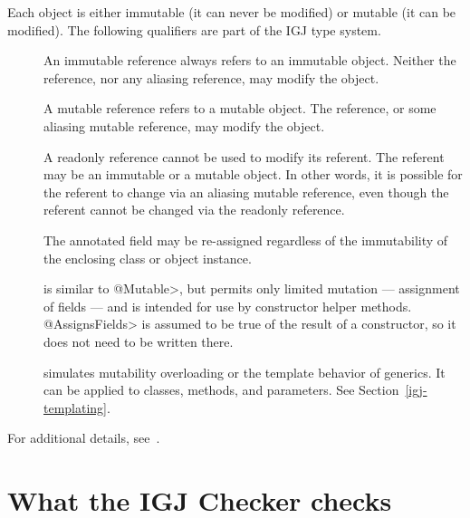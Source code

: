 Each object is either immutable (it can never be modified) or mutable (it
can be modified).  The following qualifiers are part of the IGJ type system.

\begin{description}

\item[]
  An immutable reference always refers to an immutable object.  Neither the
  reference, nor any aliasing reference, may modify the object.

\item[]
  A mutable reference refers to a mutable object.  The reference, or some
  aliasing mutable reference, may modify the object.

\item[]
  A readonly reference cannot be used to modify its referent.  The referent
  may be an immutable or a mutable object.  In other words, it is possible
  for the referent to change via an aliasing mutable reference, even though
  the referent cannot be changed via the readonly reference.

\item[]
  The annotated field may be re-assigned regardless of the
  immutability of the enclosing class or object instance.

\item[]
  is similar to \<@Mutable>, but permits only limited mutation ---
  assignment of fields --- and is intended for use by constructor helper
  methods.  \<@AssignsFields> is assumed to be true of the result of a
  constructor, so it does not need to be written there.

\item[]
  simulates mutability overloading or the template behavior of generics.
  It can be applied to classes, methods, and parameters.  See
  Section~\ref{igj-templating}.

\end{description}

For additional details, see~\cite{ZibinPAAKE2007}.


\section{What the IGJ Checker checks\label{igj-checks}}

